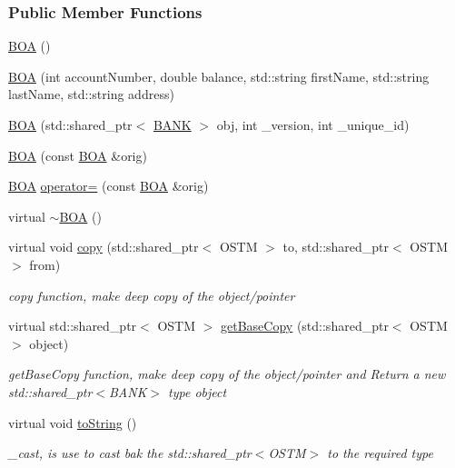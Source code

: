 \subsubsection*{Public Member Functions}
\begin{DoxyCompactItemize}
\item 
\hyperlink{class_b_o_a_ad42dc670d422172c9bcf9b3d354c8a3c}{B\+OA} ()
\item 
\hyperlink{class_b_o_a_a898c8627b8976bbe1a7d0fc780642b25}{B\+OA} (int account\+Number, double balance, std\+::string first\+Name, std\+::string last\+Name, std\+::string address)
\item 
\hyperlink{class_b_o_a_ab87192ed986e601c2eb682ea3745daf0}{B\+OA} (std\+::shared\+\_\+ptr$<$ \hyperlink{class_b_a_n_k}{B\+A\+NK} $>$ obj, int \+\_\+version, int \+\_\+unique\+\_\+id)
\item 
\hyperlink{class_b_o_a_a99ebf22a8d824761dc82e7e191e6f173}{B\+OA} (const \hyperlink{class_b_o_a}{B\+OA} \&orig)
\item 
\hyperlink{class_b_o_a}{B\+OA} \hyperlink{class_b_o_a_af24b66f0e072b29abbbe5812cab48369}{operator=} (const \hyperlink{class_b_o_a}{B\+OA} \&orig)
\item 
virtual \hyperlink{class_b_o_a_abe27b17a23ceffc6269dbe6d81de5212}{$\sim$\+B\+OA} ()
\item 
virtual void \hyperlink{class_b_o_a_a54fbcabb55b22fb72f45986768974403}{copy} (std\+::shared\+\_\+ptr$<$ O\+S\+TM $>$ to, std\+::shared\+\_\+ptr$<$ O\+S\+TM $>$ from)
\begin{DoxyCompactList}\small\item\em copy function, make deep copy of the object/pointer \end{DoxyCompactList}\item 
virtual std\+::shared\+\_\+ptr$<$ O\+S\+TM $>$ \hyperlink{class_b_o_a_a46ace5d3c945a423e93912673cadfad5}{get\+Base\+Copy} (std\+::shared\+\_\+ptr$<$ O\+S\+TM $>$ object)
\begin{DoxyCompactList}\small\item\em get\+Base\+Copy function, make deep copy of the object/pointer and Return a new std\+::shared\+\_\+ptr$<$\+B\+A\+N\+K$>$ type object \end{DoxyCompactList}\item 
virtual void \hyperlink{class_b_o_a_a348df0299997f81bcad0ec034dab0b8d}{to\+String} ()
\begin{DoxyCompactList}\small\item\em \+\_\+cast, is use to cast bak the std\+::shared\+\_\+ptr$<$\+O\+S\+T\+M$>$ to the required type \end{DoxyCompactList}\item 

\end{DoxyCompactItemize}
